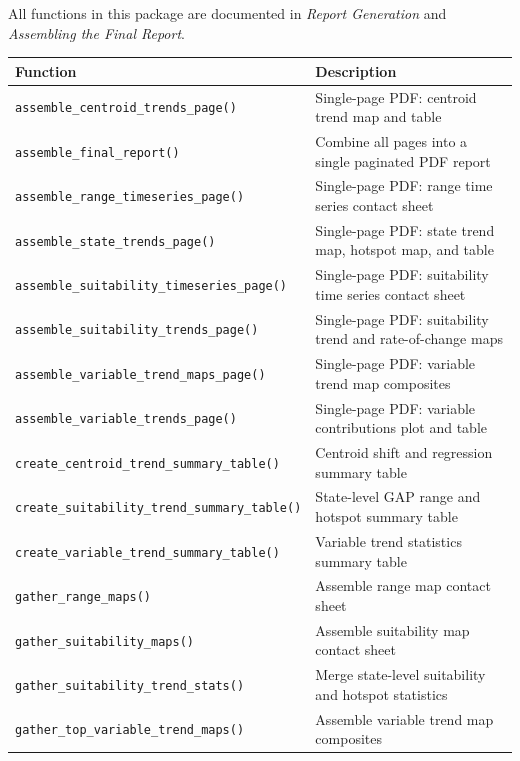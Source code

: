 \documentclass[
  letterpaper,
  DIV=11,
  numbers=noendperiod]{scrartcl}
\newcounter{none} %
\begin{document}
All functions in this package are documented in \emph{Report Generation}
and \emph{Assembling the Final Report}.

{\def\LTcaptype{none} %
\begin{longtable}[]{@{}
  >{\raggedright\arraybackslash}p{}
  >{\raggedright\arraybackslash}p{}@{}}
\toprule\noalign{}
\begin{minipage}[b]{\linewidth}\raggedright
Function
\end{minipage} & \begin{minipage}[b]{\linewidth}\raggedright
Description
\end{minipage} \\
\midrule\noalign{}
\endhead
\bottomrule\noalign{}
\endlastfoot
\texttt{assemble\_centroid\_trends\_page()} & Single-page PDF: centroid
trend map and table \\
\texttt{assemble\_final\_report()} & Combine all pages into a single
paginated PDF report \\
\texttt{assemble\_range\_timeseries\_page()} & Single-page PDF: range
time series contact sheet \\
\texttt{assemble\_state\_trends\_page()} & Single-page PDF: state trend
map, hotspot map, and table \\
\texttt{assemble\_suitability\_timeseries\_page()} & Single-page PDF:
suitability time series contact sheet \\
\texttt{assemble\_suitability\_trends\_page()} & Single-page PDF:
suitability trend and rate-of-change maps \\
\texttt{assemble\_variable\_trend\_maps\_page()} & Single-page PDF:
variable trend map composites \\
\texttt{assemble\_variable\_trends\_page()} & Single-page PDF: variable
contributions plot and table \\
\texttt{create\_centroid\_trend\_summary\_table()} & Centroid shift and
regression summary table \\
\texttt{create\_suitability\_trend\_summary\_table()} & State-level GAP
range and hotspot summary table \\
\texttt{create\_variable\_trend\_summary\_table()} & Variable trend
statistics summary table \\
\texttt{gather\_range\_maps()} & Assemble range map contact sheet \\
\texttt{gather\_suitability\_maps()} & Assemble suitability map contact
sheet \\
\texttt{gather\_suitability\_trend\_stats()} & Merge state-level
suitability and hotspot statistics \\
\texttt{gather\_top\_variable\_trend\_maps()} & Assemble variable trend
map composites \\
\end{longtable}
}
\end{document}
